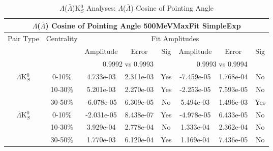 \documentclass[../AnalysisNoteJBuxton.tex]{subfiles}
\begin{document}
\begin{table}
 \centering
 \begin{tabular}{|c|c|c|c|c||c|c|c|}
  \multicolumn{8}{c}{$\Lambda$($\bar{\Lambda}$) Cosine of Pointing Angle 500MeVMaxFit SimpleExp} \\
  \hline
  \multirow{3}{*}{Pair Type} & \multirow{3}{*}{Centrality} & \multicolumn{6}{c|}{Fit Amplitudes} \\
  \cline{3-8}
   & & Amplitude & Error & Sig & Amplitude & Error & Sig \\  
  \cline{3-8}
   & & \multicolumn{3}{c||}{0.9992 vs 0.9993} & \multicolumn{3}{c|}{0.9993 vs 0.9994} \\  
  \hline  
  \multirow{3}{*}{$\Lambda$K$^{0}_{S}$}  
   &  0-10\% & 4.733e-03 & 2.311e-03 & Yes & -7.459e-05 & 1.768e-04 & No \\
   & 10-30\% & 5.201e-03 & 2.270e-03 & Yes & -2.253e-05 & 7.593e-05 & No \\
   & 30-50\% & -6.078e-05 & 6.309e-05 & No & 5.494e-03 & 1.496e-03 & Yes \\
  \hline  
  \multirow{3}{*}{$\bar{\Lambda}$K$^{0}_{S}$}  
   &  0-10\% & -2.031e-05 & 8.438e-07 & Yes & -4.978e-05 & 6.433e-05 & No \\
   & 10-30\% & 3.929e-04 & 2.778e-04 & No & 1.333e-04 & 2.362e-04 & No \\
   & 30-50\% & 1.770e-03 & 6.120e-04 & Yes & 1.169e-04 & 7.436e-05 & No \\
  \hline
 \end{tabular}
 \caption{$\Lambda$($\bar{\Lambda}$)K$^{0}_{S}$ Analyses: $\Lambda$($\bar{\Lambda}$) Cosine of Pointing Angle}
 \label{tab:LamCosPointingAngleLamK0_500MeVMaxFit_SimpleExp}
\end{table}


\end{document}
